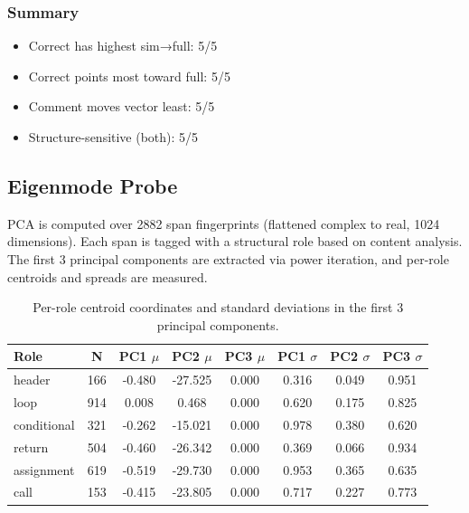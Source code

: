 {\subsubsection{Summary}
\begin{itemize}
    \item Correct has highest sim→full: 5/5
    \item Correct points most toward full: 5/5
    \item Comment moves vector least: 5/5
    \item Structure-sensitive (both): 5/5
\end{itemize}

\subsection{Eigenmode Probe}
PCA is computed over 2882 span fingerprints (flattened complex to real, 1024 dimensions). Each span is tagged with a structural role based on content analysis. The first 3 principal components are extracted via power iteration, and per-role centroids and spreads are measured.

\begin{table}[h]
\centering
\begin{tabular}{|l|c|c|c|c|c|c|c|}
\hline
\textbf{Role} & \textbf{N} & \textbf{PC1 $\mu$} & \textbf{PC2 $\mu$} & \textbf{PC3 $\mu$} & \textbf{PC1 $\sigma$} & \textbf{PC2 $\sigma$} & \textbf{PC3 $\sigma$} \\ \hline
header & 166 & -0.480 & -27.525 & 0.000 & 0.316 & 0.049 & 0.951 \\ \hline
loop & 914 & 0.008 & 0.468 & 0.000 & 0.620 & 0.175 & 0.825 \\ \hline
conditional & 321 & -0.262 & -15.021 & 0.000 & 0.978 & 0.380 & 0.620 \\ \hline
return & 504 & -0.460 & -26.342 & 0.000 & 0.369 & 0.066 & 0.934 \\ \hline
assignment & 619 & -0.519 & -29.730 & 0.000 & 0.953 & 0.365 & 0.635 \\ \hline
call & 153 & -0.415 & -23.805 & 0.000 & 0.717 & 0.227 & 0.773 \\ \hline
\end{tabular}
\caption{Per-role centroid coordinates and standard deviations in the first 3 principal components.}
\end{table}

}
